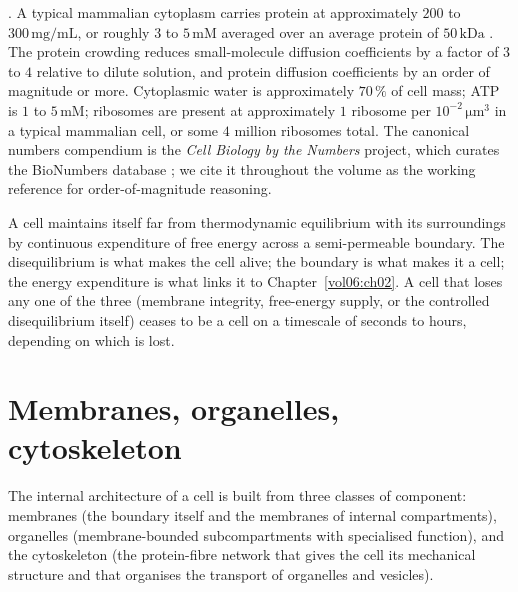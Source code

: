 . A typical
mammalian cytoplasm carries protein at approximately $200$ to
$300\,\text{mg}/\text{mL}$, or roughly $3$ to $5\,\text{mM}$ averaged
over an average protein of $50\,\text{kDa}$
\cite{paper:v6c01-luby-phelps-2000}. The protein crowding reduces
small-molecule diffusion coefficients by a factor of $3$ to $4$
relative to dilute solution, and protein diffusion coefficients by an
order of magnitude or more. Cytoplasmic water is approximately
$70\,\%$ of cell mass; ATP is $1$ to $5\,\text{mM}$; ribosomes are
present at approximately $1$ ribosome per $10^{-2}\,\si{\micro\meter}^3$
in a typical mammalian cell, or some $4$ million ribosomes total. The
canonical numbers compendium is the \emph{Cell Biology by the
Numbers} project, which curates the BioNumbers database
\cite{text:v6c01-bionumbers-2015,paper:v6c01-bionumbers-database-2010};
we cite it throughout the volume as the working reference for
order-of-magnitude reasoning.

\begin{principle}
A cell maintains itself far from thermodynamic equilibrium with its
surroundings by continuous expenditure of free energy across a
semi-permeable boundary. The disequilibrium is what makes the cell
alive; the boundary is what makes it a cell; the energy expenditure is
what links it to Chapter~\ref{vol06:ch02}. A cell that loses any one
of the three (membrane integrity, free-energy supply, or the
controlled disequilibrium itself) ceases to be a cell on a timescale
of seconds to hours, depending on which is lost.
\end{principle}

\section{Membranes, organelles, cytoskeleton}

The internal architecture of a cell is built from three classes of
component: membranes (the boundary itself and the membranes of internal
compartments), organelles (membrane-bounded subcompartments with
specialised function), and the cytoskeleton (the protein-fibre network
that gives the cell its mechanical structure and that organises the
transport of organelles and vesicles).

